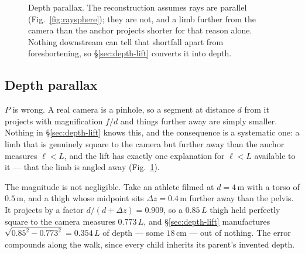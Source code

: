 \documentclass[10pt,a4paper]{article}
\newcommand{\Lt}{L}                      %
\begin{document}
\begin{figure}[t]
  \caption{Depth parallax. The reconstruction assumes rays are parallel
  (Fig.~\ref{fig:raysphere}); they are not, and a limb further from the camera
  than the anchor projects shorter for that reason alone. Nothing downstream
  can tell that shortfall apart from foreshortening, so
  \S\ref{sec:depth-lift} converts it into depth.}
  \label{fig:parallax}
\end{figure}

\subsection{Depth parallax}\label{sec:depth-parallax}

$P$ is wrong. A real camera is a pinhole, so a segment at distance $d$ from it
projects with magnification $f/d$ and things further away are simply smaller.
Nothing in \S\ref{sec:depth-lift} knows this, and the consequence is a
systematic one: a limb that is genuinely square to the camera but further away
than the anchor measures $\ell<L$, and the lift has exactly one explanation for
$\ell<L$ available to it --- that the limb is angled away
(Fig.~\ref{fig:parallax}).

The magnitude is not negligible. Take an athlete filmed at $d=4\,\mathrm{m}$
with a torso of $0.5\,\mathrm{m}$, and a thigh whose midpoint sits
$\Delta z=0.4\,\mathrm{m}$ further away than the pelvis. It projects by a factor
$d/(d+\Delta z)=0.909$, so a $0.85\,\Lt$ thigh held perfectly square to the
camera measures $0.773\,\Lt$, and \S\ref{sec:depth-lift} manufactures
$\sqrt{0.85^2-0.773^2}=0.354\,\Lt$ of depth --- some $18\,\mathrm{cm}$ --- out
of nothing. The error compounds along the walk, since every child inherits its
parent's invented depth.
\end{document}
